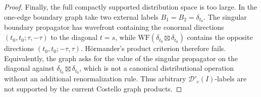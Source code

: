 \begin{proof}
  Finally, the full compactly supported distribution space is too large.
  In the one-edge boundary graph take two external labels
  \(B_1=B_2=\delta_{t_0}\).  The singular boundary propagator has
  wavefront containing the conormal directions
  \((t_0,t_0;\tau,-\tau)\) to the diagonal \(t=s\), while
  \(\mathrm{WF}(\delta_{t_0}\boxtimes\delta_{t_0})\) contains the
  opposite directions \((t_0,t_0;-\tau,\tau)\).  H\"ormander's product
  criterion therefore fails.  Equivalently, the graph asks for the value
  of the singular propagator on the diagonal against
  \(\delta_{t_0}\boxtimes\delta_{t_0}\), which is not a canonical
  distributional operation without an additional renormalization rule.
  Thus arbitrary \(\mathcal D'_c(I)\)-labels are not supported by the
  current Costello graph products.
\end{proof}

